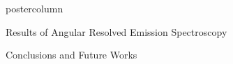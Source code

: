 \documentclass[final]{beamer}
\begin{document}
\begin{frame}
\begin{columns}
\begin{column}{.49\textwidth}
\begin{beamercolorbox}[center,wd=\textwidth]{postercolumn}
\begin{minipage}[T]{.99\textwidth}
{\begin{block}{Results of Angular Resolved Emission Spectroscopy}
            \end{block}
            \vfill
            \begin{block}{Conclusions and Future Works}

\end{block}}
\end{minipage}
\end{beamercolorbox}
\end{column}
\end{columns}
\end{frame}
\end{document}
